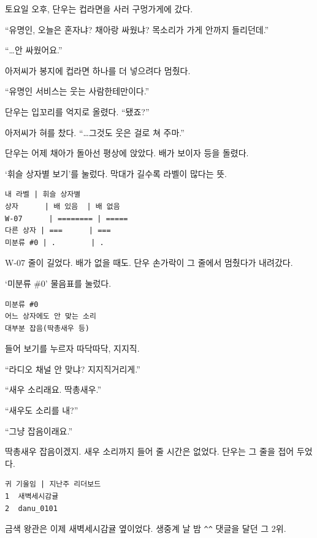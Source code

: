 \documentclass[
  korean,
  letterpaper,
  twoside,
  open=any,
  fontsize=12.5pt,
  headings=small]{scrbook}
\newcommand{\logfont}{\linespread{1}\fontsize{10.8}{15.2}\selectfont}
\begin{document}
토요일 오후, 단우는 컵라면을
사러 구멍가게에 갔다.

``유명인, 오늘은 혼자냐?
채아랑 싸웠냐? 목소리가 가게
안까지 들리던데.''

``\ldots 안 싸웠어요.''

아저씨가 봉지에 컵라면 하나를
더 넣으려다 멈췄다.

``유명인 서비스는 웃는
사람한테만이다.''

단우는 입꼬리를 억지로 올렸다.
``됐죠?''

아저씨가 혀를 찼다.
``\ldots 그것도 웃은 걸로 쳐
주마.''

단우는 어제 채아가 돌아선
평상에 앉았다. 배가 보이자
등을 돌렸다.

`휘슬 상자별 보기'를 눌렀다.
막대가 길수록 라벨이 많다는
뜻.

\begin{Verbatim}[samepage=true,frame=single,framesep=2.5mm,rulecolor=\color{gray},formatcom=\logfont]
내 라벨 | 휘슬 상자별
상자      | 배 있음  | 배 없음
W-07      | ======== | =====
다른 상자 | ===      | ===
미분류 #0 | .        | .
\end{Verbatim}

W-07 줄이 길었다. 배가 없을
때도. 단우 손가락이 그 줄에서
멈췄다가 내려갔다.

`미분류 \#0' 물음표를 눌렀다.

\begin{Verbatim}[samepage=true,frame=single,framesep=2.5mm,rulecolor=\color{gray},formatcom=\logfont]
미분류 #0
어느 상자에도 안 맞는 소리
대부분 잡음(딱총새우 등)
\end{Verbatim}

들어 보기를 누르자 따닥따닥,
지지직.

``라디오 채널 안 맞냐?
지지직거리게.''

``새우 소리래요. 딱총새우.''

``새우도 소리를 내?''

``그냥 잡음이래요.''

딱총새우 잡음이겠지. 새우
소리까지 들어 줄 시간은
없었다. 단우는 그 줄을 접어
두었다.

\begin{Verbatim}[samepage=true,frame=single,framesep=2.5mm,rulecolor=\color{gray},formatcom=\logfont]
귀 기울임 | 지난주 리더보드
1  새벽세시감귤
2  danu_0101
\end{Verbatim}

금색 왕관은 이제 새벽세시감귤
옆이었다. 생중계 날 밤
\texttt{\^{}\^{}} 댓글을 달던
그 2위.
\end{document}
